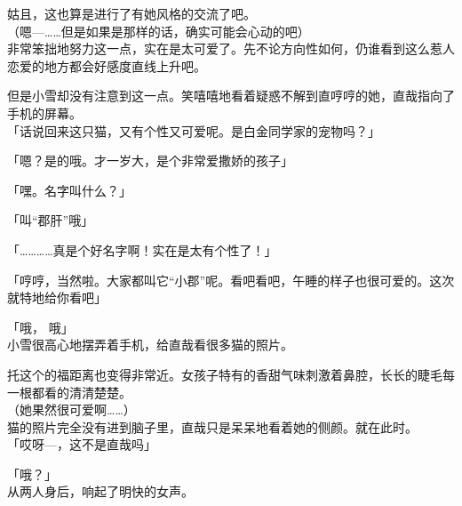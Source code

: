 姑且，这也算是进行了有她风格的交流了吧。\\

（嗯—……但是如果是那样的话，确实可能会心动的吧）\\

非常笨拙地努力这一点，实在是太可爱了。先不论方向性如何，仍谁看到这么惹人恋爱的地方都会好感度直线上升吧。

但是小雪却没有注意到这一点。笑嘻嘻地看着疑惑不解到直哼哼的她，直哉指向了手机的屏幕。\\

「话说回来这只猫，又有个性又可爱呢。是白金同学家的宠物吗？」

「嗯？是的哦。才一岁大，是个非常爱撒娇的孩子」

「嘿。名字叫什么？」

「叫“郡肝”哦」

「…………真是个好名字啊！实在是太有个性了！」

「哼哼，当然啦。大家都叫它“小郡”呢。看吧看吧，午睡的样子也很可爱的。这次就特地给你看吧」

「哦， 哦」\\

小雪很高心地摆弄着手机，给直哉看很多猫的照片。

托这个的福距离也变得非常近。女孩子特有的香甜气味刺激着鼻腔，长长的睫毛每一根都看的清清楚楚。\\

（她果然很可爱啊……）\\

猫的照片完全没有进到脑子里，直哉只是呆呆地看着她的侧颜。就在此时。\\

「哎呀—，这不是直哉吗」

「哦？」\\

从两人身后，响起了明快的女声。
